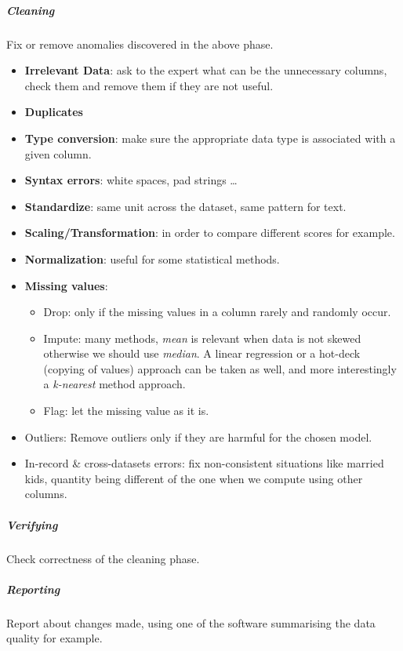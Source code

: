 \subparagraph{Cleaning} 
Fix or remove anomalies discovered in the above phase.
\begin{itemize}
    \item \textbf{Irrelevant Data}: ask to the expert what can be the unnecessary columns,
        check them and remove them if they are not useful.
    \item \textbf{Duplicates}
    \item \textbf{Type conversion}: make sure the appropriate data type is associated with
        a given column.
    \item \textbf{Syntax errors}: white spaces, pad strings \dots
    \item \textbf{Standardize}: same unit across the dataset, same pattern for text.
    \item \textbf{Scaling/Transformation}: in order to compare different scores for 
        example.
    \item \textbf{Normalization}: useful for some statistical methods.
    \item \textbf{Missing values}: 
        \begin{itemize}
            \item Drop: only if the missing values in a column rarely and randomly occur.
            \item Impute: many methods, \textit{mean} is relevant when data is not skewed 
                otherwise we should use \textit{median}. A linear regression or a hot-deck
                (copying of values) approach can be taken as well, and more interestingly 
                a \textit{k-nearest} method approach.
            \item Flag: let the missing value as it is.
        \end{itemize}
    \item Outliers: Remove outliers only if they are harmful for the chosen model.
    \item In-record \& cross-datasets errors: fix non-consistent situations like married 
        kids, quantity being different of the one when we compute using other columns.
\end{itemize}

\subparagraph{Verifying}
Check correctness of the cleaning phase.
\subparagraph{Reporting} 
Report about changes made, using one of the software summarising the data quality for 
example.



